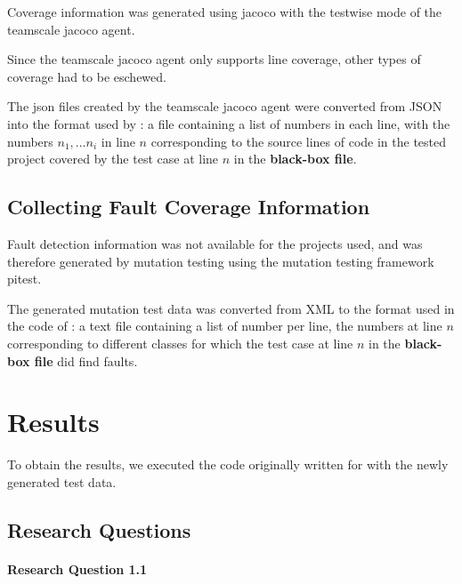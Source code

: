 Coverage information was generated using jacoco with the testwise mode
of the teamscale jacoco agent. %

Since the teamscale jacoco agent only supports line coverage, other
types of coverage had to be eschewed.


The json files created by the teamscale jacoco agent were converted
from JSON into the format used by \cite{cruciani2019scalable}: a file
containing a list of numbers in each line, with the numbers $n_1, \dots
n_i$ in line $n$ corresponding to the source lines of code in the tested
project covered by the test case at line $n$ in the \textbf{black-box
file}.

\subsection{Collecting Fault Coverage Information}


Fault detection information was not available for the projects used,
and was therefore generated by mutation testing using the mutation
testing framework pitest.

The generated mutation test data was converted from XML to the format used
in the code of \cite{cruciani2019scalable}: a text file containing a list
of number per line, the numbers at line $n$ corresponding to different
classes for which the test case at line $n$ in the \textbf{black-box file}
did find faults.

\section{Results}

To obtain the results, we executed the code originally written for
\cite{cruciani2019scalable} with the newly generated test data.

\subsection{Research Questions}

\paragraph{Research Question 1.1}

